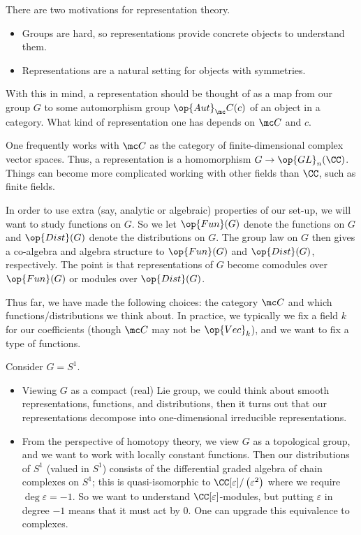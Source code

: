 \documentclass{article}
\begin{document}
There are two motivations for representation theory.
\begin{itemize}
	\item Groups are hard, so representations provide concrete objects to understand them.
	\item Representations are a natural setting for objects with symmetries.
\end{itemize}
With this in mind, a representation should be thought of as a map from our group $G$ to some automorphism group $\op{Aut}_\mc C(c)$ of an object in a category. What kind of representation one has depends on $\mc C$ and $c$.
\begin{example}
	One frequently works with $\mc C$ as the category of finite-dimensional complex vector spaces. Thus, a representation is a homomorphism $G\to\op{GL}_n(\CC)$. Things can become more complicated working with other fields than $\CC$, such as finite fields.
\end{example}
In order to use extra (say, analytic or algebraic) properties of our set-up, we will want to study functions on $G$. So we let $\op{Fun}(G)$ denote the functions on $G$ and $\op{Dist}(G)$ denote the distributions on $G$. The group law on $G$ then gives a co-algebra and algebra structure to $\op{Fun}(G)$ and $\op{Dist}(G)$, respectively. The point is that representations of $G$ become comodules over $\op{Fun}(G)$ or modules over $\op{Dist}(G)$.
\begin{remark}
	Thus far, we have made the following choices: the category $\mc C$ and which functions/distributions we think about. In practice, we typically we fix a field $k$ for our coefficients (though $\mc C$ may not be $\op{Vec}_k$), and we want to fix a type of functions.
\end{remark}
\begin{example}
	Consider $G=S^1$.
	\begin{itemize}
		\item Viewing $G$ as a compact (real) Lie group, we could think about smooth representations, functions, and distributions, then it turns out that our representations decompose into one-dimensional irreducible representations.
		\item From the perspective of homotopy theory, we view $G$ as a topological group, and we want to work with locally constant functions. Then our distributions of $S^1$ (valued in $S^1$) consists of the differential graded algebra of chain complexes on $S^1$; this is quasi-isomorphic to $\CC[\varepsilon]/\left(\varepsilon^2\right)$ where we require $\deg\varepsilon=-1$. So we want to understand $\CC[\varepsilon]$-modules, but putting $\varepsilon$ in degree $-1$ means that it must act by $0$. One can upgrade this equivalence to complexes.
	\end{itemize}
\end{example}
\end{document}
